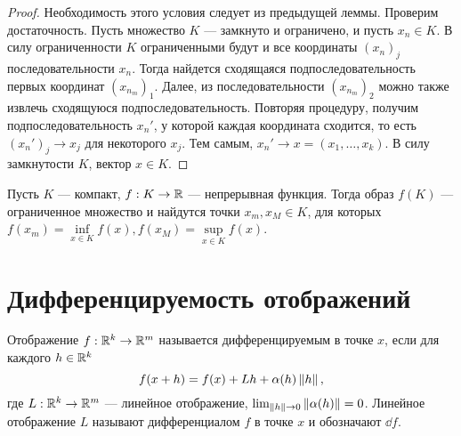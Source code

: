 \documentclass[a4paper]{article}
\theoremstyle{named}
\begin{document}
    \begin{proof}
        Необходимость этого условия следует из предыдущей леммы. Проверим достаточность. Пусть множество $K$ --- замкнуто и ограничено, и пусть $x_n \in K$. В силу ограниченности $K$ ограниченными будут и все координаты $(x_n)_j$ последовательности $x_n$. Тогда найдется сходящаяся подпоследовательность первых координат $(x_{n_m})_1$. Далее, из последовательности $(x_{n_m})_2$ можно также извлечь сходящуюся подпоследовательность. Повторяя процедуру, получим подпоследовательность $x_n'$, у которой каждая координата сходится, то есть $(x_n')_j \to x_j$ для некоторого $x_j$. Тем самым, $x_n' \to x = (x_1, \dots, x_k)$. В силу замкнутости $K$, вектор $x \in K$.
    \end{proof}

    \begin{consequence*}
        Пусть $K$ --- компакт, $f: K \to \mathbb{R}$ --- непрерывная функция. Тогда образ $f(K)$ --- ограниченное множество и найдутся точки $x_m, x_M \in K$, для которых $f(x_m) = \inf\limits_{x \in K} f(x), f(x_M) = \sup\limits_{x \in K} f(x)$.
    \end{consequence*}

    \section{Дифференцируемость отображений}

    \begin{definition*}
        Отображение $f: \mathbb{R}^k \to \mathbb{R}^m$ называется дифференцируемым в точке $x$, если для каждого $h \in \mathbb{R}^k$
        \begin{equation*}
            f(x + h) = f(x) + Lh + \alpha(h) \left\lVert h\right\rVert,
        \end{equation*}
        где $L: \mathbb{R}^k \to \mathbb{R}^m$ --- линейное отображение, $\lim_{\left\lVert h\right\rVert \to 0} \left\lVert\alpha(h)\right\rVert = 0$. Линейное отображение $L$ называют дифференциалом $f$ в точке $x$ и обозначают $\dd f$.
    \end{definition*}
\end{document}
